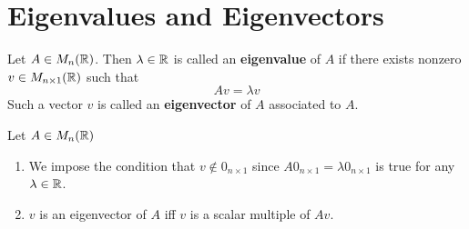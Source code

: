 \newpage
\section{Eigenvalues and Eigenvectors}

\begin{definition}
Let $A \in M_n(\mathbb{R})$. Then $\lambda \in \mathbb{R}$ is called an \textbf{eigenvalue} of $A$ if there exists nonzero $v \in M_{n \times 1}(\mathbb{R})$ such that
$$Av = \lambda v$$
Such a vector $v$ is called an \textbf{eigenvector} of $A$ associated to $A$.
\end{definition}

\begin{remark}
Let $A \in M_n(\mathbb{R})$
\begin{enumerate}
    \item We impose the condition that $v \notin 0_{n \times 1}$ since $A0_{n \times 1} = \lambda 0_{n \times 1}$ is true for any $\lambda \in \mathbb{R}$.
    \item $v$ is an eigenvector of $A$ iff $v$ is a scalar multiple of $Av$.
\end{enumerate}
\end{remark}

